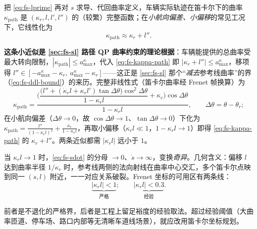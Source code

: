 \begin{theorem}[车辆路径曲率的小偏差近似]\label{thm:fs-kappa-path}
把 \cref{eq:fs-lprime} 再对 $s$ 求导、代回曲率定义，车辆实际轨迹在笛卡尔下的曲率 $\kappa_{\mathrm{path}}$ 是 $(\kappa_r,l,l',l'')$ 的（较繁）完整函数；在\emph{小航向偏差、小偏移}的常见工况下，它线性化为
\begin{equation}
  \kappa_{\mathrm{path}}\approx\kappa_r+l''.
  \label{eq:fs-kappa-path}
\end{equation}
\end{theorem}
\begin{note}
\textbf{这条小近似是 \cref{sec:fs-sl} 路径 QP 曲率约束的理论根据}：车辆能提供的总曲率受最大转向限制，$|\kappa_{\mathrm{path}}|\le a^\kappa_{\max}$，代入 \cref{eq:fs-kappa-path} 即 $|\kappa_r+l''|\le a^\kappa_{\max}$，移项得 $l''\in[-a^\kappa_{\max}-\kappa_r,\ a^\kappa_{\max}-\kappa_r]$——这正是 \cref{sec:fs-sl} 那个“\emph{减去}参考线曲率”的界（\cref{eq:fs-ddl-bound}）的来历。完整非线性式（笛卡尔曲率经 Frenet 帧换算\cite{werling2010frenet}）为
\[
  \kappa_{\mathrm{path}}=\frac{\Big(\dfrac{\big(l''+(\dot\kappa_r l+\kappa_r l')\tan\Delta\theta\big)\cos^2\Delta\theta}{1-\kappa_r l}+\kappa_r\Big)\cos\Delta\theta}{1-\kappa_r l},
  \qquad \Delta\theta=\theta-\theta_r;
\]
在小航向偏差（$\Delta\theta\to0$，故 $\cos\Delta\theta\to1$、$\tan\Delta\theta\to0$）下化为 $\kappa_{\mathrm{path}}=\frac{l''}{(1-\kappa_r l)^2}+\frac{\kappa_r}{1-\kappa_r l}$，再取小偏移（$\kappa_r l\ll1$，$1-\kappa_r l\to1$）即得 \cref{eq:fs-kappa-path} 的 $\kappa_r+l''$。两条近似都需 $|\kappa_r l|$ 远小于 $1$。
\end{note}

\begin{theorem}\label{thm:fs-degeneracy}
当 $\kappa_r l\to1$ 时，\cref{eq:fs-sdot} 的分母 $\to0$、$\dot s\to\infty$，变换\emph{奇异}。几何含义：偏移 $l$ 达到曲率半径 $1/\kappa_r$ 时，参考线两侧的法向射线在曲率中心交汇，多个笛卡尔点映到同一 $(s,l)$ 附近，一一对应关系破裂。Frenet 坐标的可用区有两条线：
\begin{equation}
  \underbrace{|\kappa_r l|<1}_{\text{严格}};\qquad\underbrace{|\kappa_r l|<0.3}_{\text{经验}}.
  \label{eq:fs-usable}
\end{equation}
\end{theorem}
前者是不退化的严格界，后者是工程上留足裕度的经验取法。超过经验阈值（大曲率匝道、停车场、路口内部等无清晰车道线场景），就应改用笛卡尔坐标规划。


